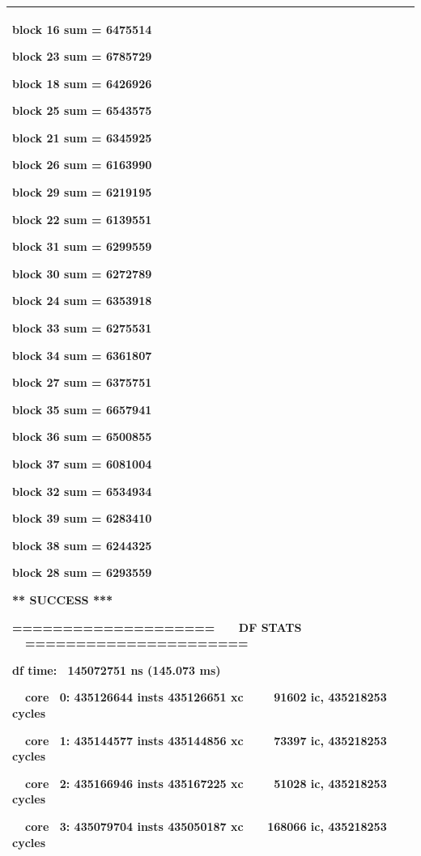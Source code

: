 \documentclass[a4paper]{article}
\begin{document}
\begin{flushleft}
\begin{tiny}
\begin{supertabular}{|m{6.34626in}|}
{\ttfamily block 16 sum = 6475514}

{\ttfamily block 23 sum = 6785729}

{\ttfamily block 18 sum = 6426926}

{\ttfamily block 25 sum = 6543575}

{\ttfamily block 21 sum = 6345925}

{\ttfamily block 26 sum = 6163990}

{\ttfamily block 29 sum = 6219195}

{\ttfamily block 22 sum = 6139551}

{\ttfamily block 31 sum = 6299559}

{\ttfamily block 30 sum = 6272789}

{\ttfamily block 24 sum = 6353918}

{\ttfamily block 33 sum = 6275531}

{\ttfamily block 34 sum = 6361807}

{\ttfamily block 27 sum = 6375751}

{\ttfamily block 35 sum = 6657941}

{\ttfamily block 36 sum = 6500855}

{\ttfamily block 37 sum = 6081004}

{\ttfamily block 32 sum = 6534934}

{\ttfamily block 39 sum = 6283410}

{\ttfamily block 38 sum = 6244325}

{\ttfamily block 28 sum = 6293559}

{\ttfamily *** SUCCESS ***}

{\ttfamily ==================== \ \ \ DF STATS
\ \ ======================}

{\ttfamily df time: \ 145072751 ns (145.073 ms)}

{\ttfamily \ \ core \ 0: 435126644 insts
435126651 xc \ \ \ \ 91602 ic, 435218253 cycles}

{\ttfamily \ \ core \ 1: 435144577 insts
435144856 xc \ \ \ \ 73397 ic, 435218253 cycles}

{\ttfamily \ \ core \ 2: 435166946 insts
435167225 xc \ \ \ \ 51028 ic, 435218253 cycles}

\ttfamily \ \ core \ 3: 435079704 insts
435050187 xc \ \ \ 168066 ic, 435218253 cycles\\\hline
\end{supertabular}
\end{tiny}
\end{flushleft}
\end{document}
